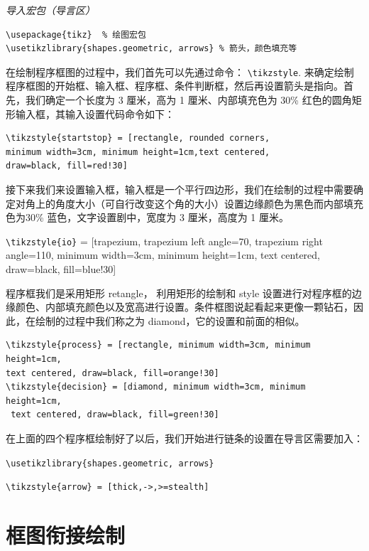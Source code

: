 \documentclass[cn,11pt, simple]{elegantbook}
\begin{document}
\textit{导入宏包（导言区）}

\begin{lstlisting}
\usepackage{tikz}  % 绘图宏包
\usetikzlibrary{shapes.geometric, arrows} % 箭头，颜色填充等
\end{lstlisting}

 \begin{tcolorbox}[enhanced,arc=3mm,boxrule=1.5mm,
 	frame hidden,colback=blue!10!white,
 	borderline={1mm}{0mm}{blue,dotted} ]
	在绘制程序框图的过程中，我们首先可以先通过命令： \verb|\tikzstyle|. 来确定绘制程序框图的开始框、输入框、程序框、条件判断框，然后再设置箭头是指向。首先，我们确定一个长度为 3 厘米，高为 1 厘米、内部填充色为 30\% 红色的圆角矩形输入框，其输入设置代码命令如下：
	\end{tcolorbox}

\begin{lstlisting}
\tikzstyle{startstop} = [rectangle, rounded corners,
minimum width=3cm, minimum height=1cm,text centered,
draw=black, fill=red!30]
\end{lstlisting}	

接下来我们来设置输入框，输入框是一个平行四边形，我们在绘制的过程中需要确定对角上的角度大小（可自行改变这个角的大小）设置边缘颜色为黑色而内部填充色为30\% 蓝色，文字设置剧中，宽度为 3 厘米，高度为 1 厘米。

\begin{tcolorbox}
	\verb|\tikzstyle{io}| = [trapezium, trapezium left angle=70, trapezium right angle=110, minimum width=3cm, minimum height=1cm, text centered, draw=black, fill=blue!30]
\end{tcolorbox}

程序框我们是采用矩形 retangle， 利用矩形的绘制和 style 设置进行对程序框的边缘颜色、内部填充颜色以及宽高进行设置。条件框图说起看起来更像一颗钻石，因此，在绘制的过程中我们称之为 diamond，它的设置和前面的相似。

\begin{lstlisting}
\tikzstyle{process} = [rectangle, minimum width=3cm, minimum height=1cm,
text centered, draw=black, fill=orange!30]
\tikzstyle{decision} = [diamond, minimum width=3cm, minimum height=1cm,
 text centered, draw=black, fill=green!30]
\end{lstlisting}
在上面的四个程序框绘制好了以后，我们开始进行链条的设置在导言区需要加入：

\verb|\usetikzlibrary{shapes.geometric, arrows}|

\verb|\tikzstyle{arrow} = [thick,->,>=stealth]|

\section{框图衔接绘制}
\end{document}
